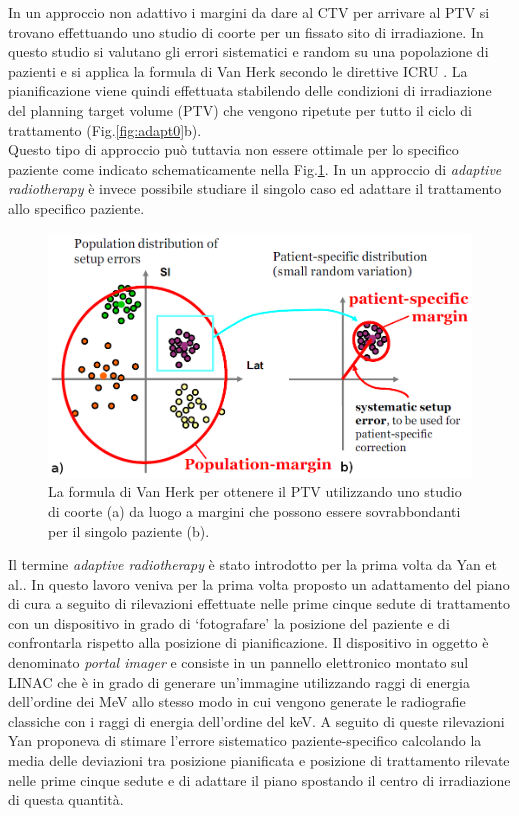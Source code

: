 In un approccio non adattivo i margini da dare al CTV per arrivare al PTV si trovano effettuando uno studio di coorte per un fissato sito di irradiazione. In questo studio si valutano gli errori sistematici e random su una popolazione di pazienti e si applica la formula di Van Herk secondo le direttive ICRU \cite{ICRU62}. La pianificazione viene quindi effettuata stabilendo delle condizioni di irradiazione del planning target volume (PTV)  che vengono ripetute per tutto il ciclo di trattamento (Fig.\ref{fig:adapt0}b).\\
Questo tipo di approccio può tuttavia non essere ottimale per lo specifico paziente come indicato schematicamente nella Fig.\ref{fig:margins}. In un approccio di \textit{adaptive radiotherapy} è invece possibile studiare il singolo caso ed adattare il trattamento allo specifico paziente.
\begin{figure}
\centering
\includegraphics[width=.8\textwidth]{./cap3/margins.png}
\caption{La formula di Van Herk per ottenere il PTV utilizzando uno studio di coorte (a) da luogo a margini che possono essere sovrabbondanti per il singolo paziente (b).}
\label{fig:margins}
\end{figure}

Il termine \textit{adaptive radiotherapy} è stato introdotto per la prima volta  da Yan et al.\cite{Yan1996}. In questo lavoro veniva per la prima volta proposto un adattamento del piano di cura a seguito di rilevazioni effettuate nelle prime cinque sedute di trattamento con un dispositivo in grado di `fotografare' la posizione del paziente e di confrontarla rispetto alla posizione di pianificazione. Il dispositivo in oggetto è denominato \textit{portal imager} e consiste in un pannello elettronico montato sul LINAC che è in grado di generare un'immagine utilizzando raggi di energia dell'ordine dei MeV allo stesso modo in cui vengono generate le radiografie classiche con i raggi di energia dell'ordine del keV. A seguito di queste rilevazioni Yan proponeva di stimare l'errore sistematico paziente-specifico calcolando la media delle deviazioni tra posizione pianificata e posizione di trattamento rilevate nelle prime cinque sedute e di adattare il piano spostando il centro di irradiazione di questa quantità.

